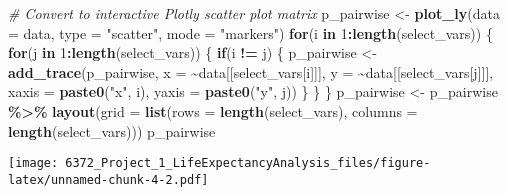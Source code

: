 \documentclass[
]{article}
\newenvironment{Shaded}{\begin{snugshade}}{\end{snugshade}}
\newcommand{\AttributeTok}[1]{\textcolor[rgb]{0.13,0.29,0.53}{#1}}
\newcommand{\CommentTok}[1]{\textcolor[rgb]{0.56,0.35,0.01}{\textit{#1}}}
\newcommand{\ControlFlowTok}[1]{\textcolor[rgb]{0.13,0.29,0.53}{\textbf{#1}}}
\newcommand{\DecValTok}[1]{\textcolor[rgb]{0.00,0.00,0.81}{#1}}
\newcommand{\FunctionTok}[1]{\textcolor[rgb]{0.13,0.29,0.53}{\textbf{#1}}}
\newcommand{\NormalTok}[1]{#1}
\newcommand{\OtherTok}[1]{\textcolor[rgb]{0.56,0.35,0.01}{#1}}
\newcommand{\SpecialCharTok}[1]{\textcolor[rgb]{0.81,0.36,0.00}{\textbf{#1}}}
\newcommand{\StringTok}[1]{\textcolor[rgb]{0.31,0.60,0.02}{#1}}
\begin{document}
\begin{Shaded}
\begin{Highlighting}[]
\CommentTok{\# Convert to interactive Plotly scatter plot matrix}
\NormalTok{p\_pairwise }\OtherTok{\textless{}{-}} \FunctionTok{plot\_ly}\NormalTok{(}\AttributeTok{data =}\NormalTok{ data, }\AttributeTok{type =} \StringTok{"scatter"}\NormalTok{, }\AttributeTok{mode =} \StringTok{"markers"}\NormalTok{)}
\ControlFlowTok{for}\NormalTok{(i }\ControlFlowTok{in} \DecValTok{1}\SpecialCharTok{:}\FunctionTok{length}\NormalTok{(select\_vars)) \{}
  \ControlFlowTok{for}\NormalTok{(j }\ControlFlowTok{in} \DecValTok{1}\SpecialCharTok{:}\FunctionTok{length}\NormalTok{(select\_vars)) \{}
    \ControlFlowTok{if}\NormalTok{(i }\SpecialCharTok{!=}\NormalTok{ j) \{}
\NormalTok{      p\_pairwise }\OtherTok{\textless{}{-}} \FunctionTok{add\_trace}\NormalTok{(p\_pairwise, }\AttributeTok{x =} \SpecialCharTok{\textasciitilde{}}\NormalTok{data[[select\_vars[i]]], }\AttributeTok{y =} \SpecialCharTok{\textasciitilde{}}\NormalTok{data[[select\_vars[j]]], }
                              \AttributeTok{xaxis =} \FunctionTok{paste0}\NormalTok{(}\StringTok{"x"}\NormalTok{, i), }\AttributeTok{yaxis =} \FunctionTok{paste0}\NormalTok{(}\StringTok{"y"}\NormalTok{, j))}
\NormalTok{    \}}
\NormalTok{  \}}
\NormalTok{\}}
\NormalTok{p\_pairwise }\OtherTok{\textless{}{-}}\NormalTok{ p\_pairwise }\SpecialCharTok{\%\textgreater{}\%} 
  \FunctionTok{layout}\NormalTok{(}\AttributeTok{grid =} \FunctionTok{list}\NormalTok{(}\AttributeTok{rows =} \FunctionTok{length}\NormalTok{(select\_vars), }\AttributeTok{columns =} \FunctionTok{length}\NormalTok{(select\_vars)))}
\NormalTok{p\_pairwise}
\end{Highlighting}
\end{Shaded}

\texttt{[image: 6372\_Project\_1\_LifeExpectancyAnalysis\_files/figure-latex/unnamed-chunk-4-2.pdf]}
\end{document}
